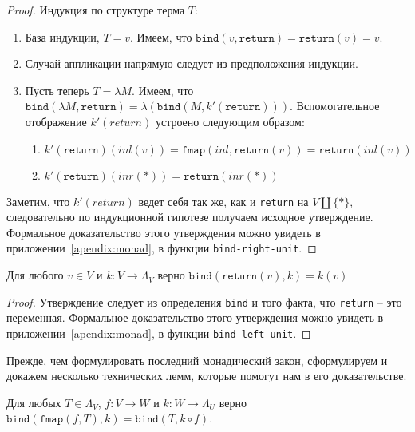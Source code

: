 \begin{proof}
  Индукция по структуре терма $T$:
  \begin{enumerate}
    \item База индукции, $T = v$. Имеем, что $\texttt{bind}(v, \texttt{return}) = \texttt{return}(v) = v$.
    \item Случай аппликации напрямую следует из предположения индукции.
    \item Пусть теперь $T = \lambda M$. Имеем, что $\texttt{bind}(\lambda M, \texttt{return}) = \lambda (\texttt{bind}(M, k'(\texttt{return})))$. Вспомогательное отображение $k'(return)$ устроено следующим образом:
    \begin{enumerate}
      \item $k'(\texttt{return})(inl(v)) = \texttt{fmap}(inl, \texttt{return}(v)) = \texttt{return}(inl(v))$
      \item $k'(\texttt{return})(inr(*)) = \texttt{return}(inr(*))$
    \end{enumerate}
  \end{enumerate}

  Заметим, что $k'(return)$ ведет себя так же, как и \texttt{return} на $V \coprod \{*\}$, следовательно по индукционной гипотезе получаем исходное утверждение.
  Формальное доказательство этого утверждения можно увидеть в приложении~\ref{apendix:monad}, в функции \texttt{bind-right-unit}.
\end{proof}

\begin{prop}
  \label{monad:bind-left-unit}
  Для любого $v \in V$ и $k : V \to \Lambda_{V}$ верно $\texttt{bind}(\texttt{return}(v), k) = k(v)$
\end{prop}

\begin{proof}
  Утверждение следует из определения \texttt{bind} и того факта, что \texttt{return} -- это переменная. Формальное доказательство этого утверждения можно увидеть в приложении~\ref{apendix:monad}, в функции \texttt{bind-left-unit}.
\end{proof}

Прежде, чем формулировать последний монадический закон, сформулируем и докажем несколько технических лемм, которые помогут нам в его доказательстве.

\begin{lemma}
  \label{monad:bind-fmap-comm-lhs}
  Для любых $T \in \Lambda_{V}$, $f : V \to W$ и $k : W \to \Lambda_{U}$ верно $\texttt{bind}(\texttt{fmap}(f, T), k) = \texttt{bind}(T, k \circ f)$.
\end{lemma}


